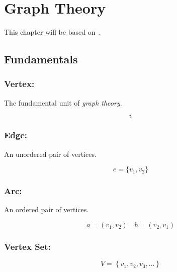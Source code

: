 \documentclass[../../mathematics_cheat_sheet.tex]{subfiles}
\begin{document}
\chapter{Graph Theory}
This chapter will be based on~\citet{GodsilRoyle2001}\cite{GodsilRoyle2001}.
\section{Fundamentals}
\subsection{Vertex:}
The fundamental unit of \emph{graph theory}.

\[
  v
\]

\begin{center}
\end{center}

\subsection{Edge:}
An unordered pair of vertices.

\[
  e=\{v_{1},v_{2}\}
\]
\begin{center}
\end{center}
\subsection{Arc:}
An ordered pair of vertices.

\[
  a=(v_{1},v_{2})\quad
b=(v_{2},v_{1})\]
\begin{center}
  \quad
\end{center}

\subsection{Vertex Set:}
\[
  V=\left\{v_{1}, v_{2}, v_{3}, \ldots\right\}
\]
\end{document}
